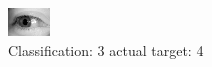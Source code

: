 \begin{figure}[h!]
\begin{center}
\includegraphics[width=0.60\columnwidth]{figures/ID3160_class_3_target_4.png}
\end{center}
\caption{ Classification: 3 actual target: 4}
\label{fig:ID3160_class_3_target_4}
\end{figure}
